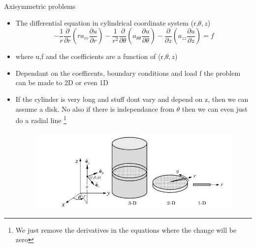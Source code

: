 	\begin{frame}{Axisymmetric problems}
		\begin{itemize}
			\item The differential equation in cylindrical coordinate system (r,$\theta,z$)
			\begin{equation}
				-\frac{1}{r}\frac{\partial}{\partial r}\left(ra_{rr}\frac{\partial u}{\partial r} \right)
				- \frac{1}{r^2}\frac{\partial}{\partial \theta}\left(a_{\theta\theta}\frac{\partial u}{\partial \theta} \right)
				- \frac{\partial}{\partial z}\left(a_{zz}\frac{\partial u}{\partial z} \right) = f
			\end{equation} 
			\item where u,f and the coefficients are a function of (r,$\theta,z$)
			\item Dependant on the coefficents, boundary conditions and load f the problem can be made to 2D or even 1D
			\item If the cylinder is very long and stuff dont vary and depend on z, then we can assume a disk. No also if there is independance from $\theta$ then we can even just do a radial line \footnote{We just remove the derivatives in the equations where the change will be zero}
			\begin{figure}
				\centering
				\includegraphics[width=0.8 \linewidth]{Figure/fig27} 		
			\end{figure}
		\end{itemize}
	\end{frame}


